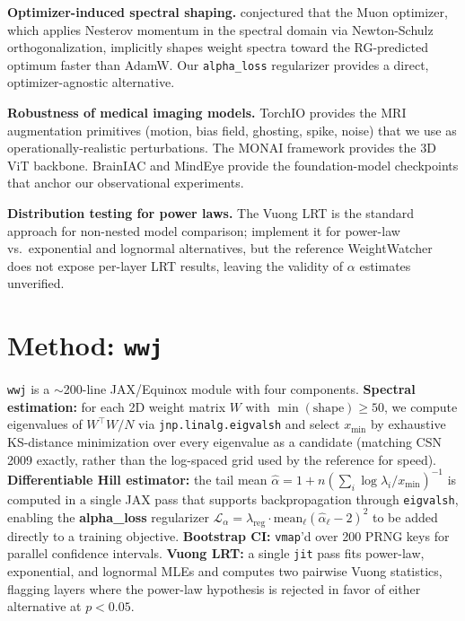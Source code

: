 \documentclass{article} %
\theoremstyle{plain}
\theoremstyle{definition}
\theoremstyle{remark}
\begin{document}
\textbf{Optimizer-induced spectral shaping.} \citet{jordan2024muon} conjectured that the Muon optimizer, which applies Nesterov momentum in the spectral domain via Newton-Schulz orthogonalization, implicitly shapes weight spectra toward the RG-predicted optimum faster than AdamW. Our \texttt{alpha\_loss} regularizer provides a direct, optimizer-agnostic alternative.

\textbf{Robustness of medical imaging models.} TorchIO \citep{perezgarcia2021torchio} provides the MRI augmentation primitives (motion, bias field, ghosting, spike, noise) that we use as operationally-realistic perturbations. The MONAI framework \citep{cardoso2022monai} provides the 3D ViT backbone. BrainIAC \citep{brainiac2024} and MindEye \citep{scotti2024realtime} provide the foundation-model checkpoints that anchor our observational experiments.

\textbf{Distribution testing for power laws.} The Vuong LRT \citep{vuong1989likelihood} is the standard approach for non-nested model comparison; \citet{alstott2014powerlaw} implement it for power-law vs.\ exponential and lognormal alternatives, but the reference WeightWatcher does not expose per-layer LRT results, leaving the validity of $\alpha$ estimates unverified.

\section{Method: \texttt{wwj}}
\label{sec:method}

\texttt{wwj} is a $\sim$200-line JAX/Equinox module with four components. \textbf{Spectral estimation:} for each 2D weight matrix $W$ with $\min(\text{shape}) \geq 50$, we compute eigenvalues of $W^\top W / N$ via \texttt{jnp.linalg.eigvalsh} and select $x_{\min}$ by exhaustive KS-distance minimization over every eigenvalue as a candidate (matching CSN 2009 exactly, rather than the log-spaced grid used by the reference for speed). \textbf{Differentiable Hill estimator:} the tail mean $\hat\alpha = 1 + n \left(\sum_{i} \log \lambda_i / x_{\min}\right)^{-1}$ is computed in a single JAX pass that supports backpropagation through \texttt{eigvalsh}, enabling the \textbf{alpha\_loss} regularizer $\mathcal{L}_\alpha = \lambda_{\text{reg}} \cdot \text{mean}_\ell(\hat\alpha_\ell - 2)^2$ to be added directly to a training objective. \textbf{Bootstrap CI:} \texttt{vmap}'d over 200 PRNG keys for parallel confidence intervals. \textbf{Vuong LRT:} a single \texttt{jit} pass fits power-law, exponential, and lognormal MLEs and computes two pairwise Vuong statistics, flagging layers where the power-law hypothesis is rejected in favor of either alternative at $p < 0.05$.
\end{document}
